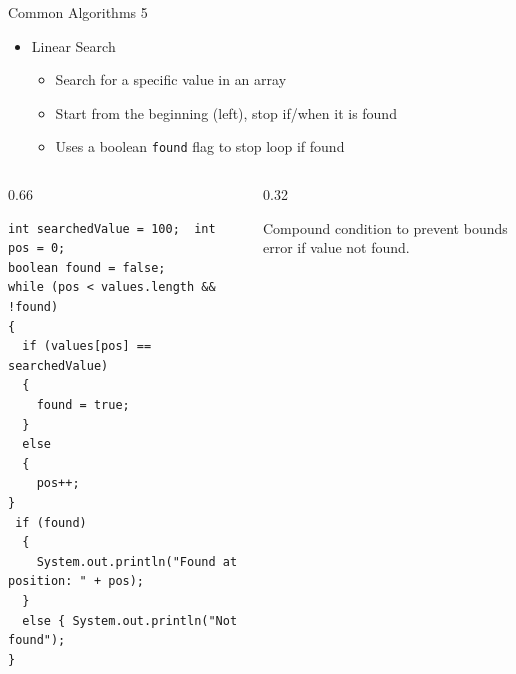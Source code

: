 \documentclass[aspectratio=43,10pt,t]{beamer}
\newcommand{\code}[1]{\texttt{#1}}
\newcommand{\callout}[2][\linewidth]{%
  {\setlength{\fboxsep}{3pt}\colorbox{callout}{%
    \parbox{\dimexpr#1-6pt\relax}{\raggedright\footnotesize #2}}}}
\begin{document}
\begin{frame}[fragile]{Common Algorithms 5}
  \begin{itemize}
    \item Linear Search
      \begin{itemize}
        \item Search for a specific value in an array
        \item Start from the beginning (left), stop if/when it is found
        \item Uses a boolean \code{found} flag to stop loop if found
      \end{itemize}
  \end{itemize}
  \begin{columns}[T]
    \begin{column}{0.66\textwidth}
\begin{lstlisting}[basicstyle=\ttfamily\scriptsize]
int searchedValue = 100;  int pos = 0;
boolean found = false;
while (pos < values.length && !found)
{
  if (values[pos] == searchedValue)
  {
    found = true;
  }
  else
  {
    pos++;
}
 if (found)
  {
    System.out.println("Found at position: " + pos);
  }
  else { System.out.println("Not found");
}
\end{lstlisting}
    \end{column}
    \begin{column}{0.32\textwidth}
      \vskip10mm
      \callout{Compound condition to prevent bounds error if value not found.}
    \end{column}
  \end{columns}
\end{frame}
\end{document}
